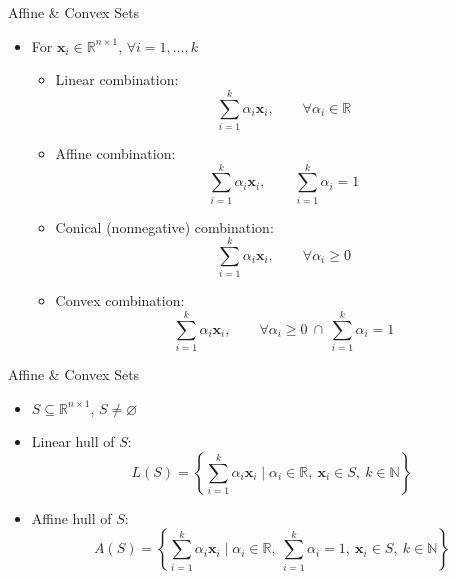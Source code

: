 \documentclass[aspectratio=169,hyperref,UTF8,CJK]{beamer}
\newcommand{\R}{\mathbb{R}}
\newcommand{\vect}[1]{\boldsymbol{#1}}
\begin{document}
\begin{frame}{Affine \& Convex Sets}
  \small
  \begin{itemize}
    \item For $\vect{x}_i\in\R^{n\times1}$, $\forall i=1,\ldots,k$
      \begin{itemize}
        \item Linear combination:
          \begin{equation*}\sum_{i=1}^{k}\alpha_i\vect{x}_i,\qquad\forall\alpha_i\in\R\end{equation*}
        \item Affine combination:
          \begin{equation*}\sum_{i=1}^{k}\alpha_i\vect{x}_i,\qquad\sum_{i=1}^{k}\alpha_i=1\end{equation*}
        \item Conical (nonnegative) combination:
          \begin{equation*}\sum_{i=1}^{k}\alpha_i\vect{x}_i,\qquad\forall\alpha_i\ge0\end{equation*}
        \item Convex combination:
          \begin{equation*}\sum_{i=1}^{k}\alpha_i\vect{x}_i,\qquad
            \forall\alpha_i\ge0\ \cap\ \sum_{i=1}^{k}\alpha_i=1\end{equation*}
      \end{itemize}
  \end{itemize}
\end{frame}

\begin{frame}{Affine \& Convex Sets}
  \begin{itemize}
    \item $S\subseteq\R^{n\times1}$, $S\ne\varnothing$
    \item Linear hull of $S$:
      \begin{equation*}
        L(S)=\left\{\sum_{i=1}^{k}\alpha_i\vect{x}_i
        \mid \alpha_i\in\R,\ \vect{x}_i\in S,\ k\in\mathbb{N}\right\}
      \end{equation*}
    \item Affine hull of $S$:
      \begin{equation*}
        A(S)=\left\{\sum_{i=1}^{k}\alpha_i\vect{x}_i
        \mid \alpha_i\in\R,\ \sum_{i=1}^{k}\alpha_i=1,\ \vect{x}_i\in S,\ k\in\mathbb{N}\right\}
      \end{equation*}
  \end{itemize}
\end{frame}
\end{document}
